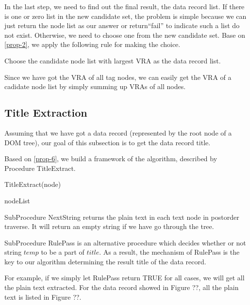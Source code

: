 In the last step, we need to find out the final result, 
the data record list.
If there is one or zero list in the new candidate set, 
the problem is simple because we can just return the node list as our answer 
or return``fail'' to indicate such a list do not exist.
Otherwise, we need to choose one from the new candidate set.
Base on \ref{prop-2}, we apply the following rule for making the choice.

\begin{newrule}\label{rule-2}
Choose the candidate node list with largest VRA as the data record list.
\end{newrule}

Since we have got the VRA of all tag nodes, we can easily get the VRA of a cadidate node list 
by simply summing up VRAs of all nodes.

\subsection{Title Extraction}

Assuming that we have got a data record (represented by the root node of a DOM tree), 
our goal of this subsection is to get the data record title.

Based on \ref{prop-6}, we build a framework of the algorithm, 
described by Procedure TitleExtract.

\begin{algorithm}[htbp]
\caption{TitleExtract(node)}
\begin{algorithmic}[1]\label{algo:title}
		\ELSE
		\ENDIF
	\ENDWHILE	
	\RETURN nodeList
\end{algorithmic}
\end{algorithm}

SubProcedure NextString returns the plain text in each text node
in postorder traverse. It will return an empty string if we have go through the tree.

SubProcedure RulePass is an alternative procedure 
which decides whether or not string $temp$ to be a part of $title$.
As a result, the mechanism of RulePass is the key to our algorithm 
determining the result title of the data record.

For example, if we simply let RulePass return TRUE for all cases,
we will get all the plain text extracted. 
For the data record showed in Figure ??,
all the plain text is listed in Figure ??. 

